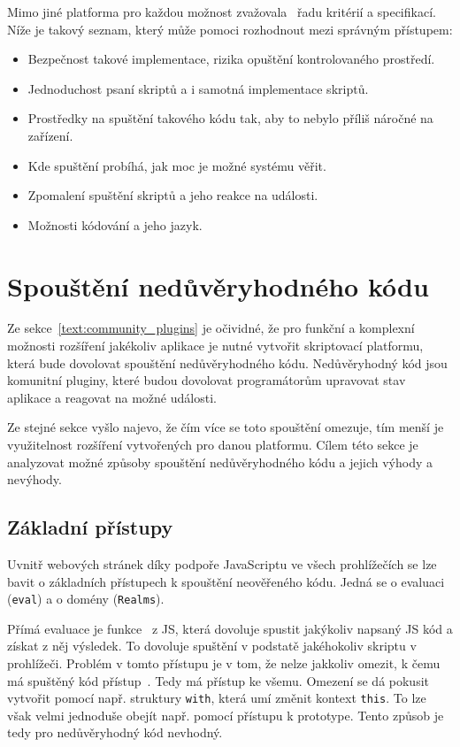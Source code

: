 Mimo jiné platforma pro každou možnost zvažovala~\cite{figma_plugins_blog, figma_website} řadu kritérií a specifikací. 
Níže je takový seznam, který může pomoci rozhodnout mezi správným přístupem:

\begin{itemize}
    \item Bezpečnost takové implementace, rizika opuštění kontrolovaného prostředí.
    \item Jednoduchost psaní skriptů a i samotná implementace skriptů.
    \item Prostředky na spuštění takového kódu tak, aby to nebylo příliš náročné na zařízení.
    \item Kde spuštění probíhá, jak moc je možné systému věřit.
    \item Zpomalení spuštění skriptů a jeho reakce na události.
    \item Možnosti kódování a jeho jazyk.
\end{itemize}

\section{Spouštění nedůvěryhodného kódu}\label{text:anaylza/spousteniNeduveryhodnehoKodu}

Ze sekce~\ref{text:community_plugins} je očividné, že pro funkční a komplexní možnosti rozšíření jakékoliv aplikace je nutné vytvořit skriptovací platformu, která bude dovolovat spouštění nedůvěryhodného kódu.
Nedůvěryhodný kód jsou komunitní pluginy, které budou dovolovat programátorům upravovat stav aplikace a reagovat na možné události.

Ze stejné sekce vyšlo najevo, že čím více se toto spouštění omezuje, tím menší je využitelnost rozšíření vytvořených pro danou platformu.
Cílem této sekce je analyzovat možné způsoby spouštění nedůvěryhodného kódu a jejich výhody a nevýhody.

\subsection{Základní přístupy}

Uvnitř webových stránek díky podpoře JavaScriptu ve všech prohlížečích se lze bavit o základních přístupech k spouštění neověřeného kódu.
Jedná se o evaluaci (\texttt{eval}) a o domény (\texttt{Realms}).

Přímá evaluace je funkce~\cite{eval} z JS, která dovoluje spustit jakýkoliv napsaný JS kód a získat z něj výsledek.
To dovoluje spuštění v podstatě jakéhokoliv skriptu v prohlížeči.
Problém v tomto přístupu je v tom, že nelze jakkoliv omezit, k čemu má spuštěný kód přístup~\cite{eval, shadowrealms, figma_plugins_blog}.
Tedy má přístup ke všemu.
Omezení se dá pokusit vytvořit pomocí např. struktury \texttt{with}, která umí změnit kontext \texttt{this}.
To lze však velmi jednoduše obejít např. pomocí přístupu k prototype.
Tento způsob je tedy pro nedůvěryhodný kód nevhodný.

